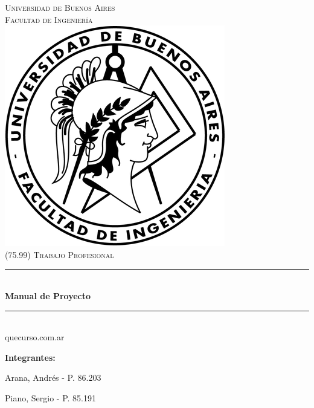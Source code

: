 \documentclass[a4paper,11pt]{article}
\begin{document}

\thispagestyle{empty}

\begin{titlepage}

\newcommand{\HRule}{\rule{\linewidth}{0.5mm}}
\newenvironment{bottompar}{\par\vspace*{\fill}}{\clearpage}

\center

\textsc{\LARGE Universidad de Buenos Aires}\\[0.5cm]
\textsc{\Large Facultad de Ingeniería}\\[1.5cm]

\includegraphics[scale=0.5]{src/common/logo.png}\\[1cm]


\textsc{\large (75.99) Trabajo Profesional}\\[0.25cm]
\HRule \\[0.4cm]
{\huge \bfseries Manual de Proyecto}
\HRule \\[0.4cm]

{\large quecurso.com.ar}

\begin{bottompar}
\flushleft
{\bfseries Integrantes:}

Arana, Andrés          - P. 86.203

Piano, Sergio          - P. 85.191
\end{bottompar}

\end{titlepage}
\end{document}
